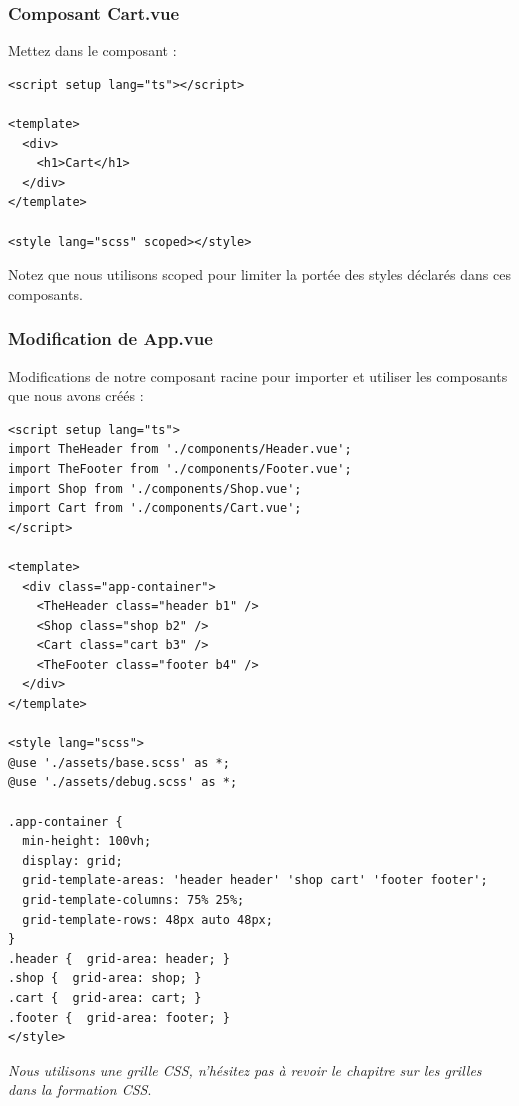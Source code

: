 \documentclass{article}
\begin{document}
\subsubsection{Composant {\color{monOrange}Cart.vue}}
Mettez dans le composant :
\begin{verbatim}
<script setup lang="ts"></script>

<template>
  <div>
    <h1>Cart</h1>
  </div>
</template>

<style lang="scss" scoped></style>
\end{verbatim}

Notez que nous utilisons {\color{monOrange}scoped} pour limiter la portée des styles déclarés dans ces composants.

\subsubsection{Modification de {\color{monOrange}App.vue}}
Modifications de notre composant racine pour importer et utiliser les composants que nous avons créés :
\begin{verbatim}
<script setup lang="ts">
import TheHeader from './components/Header.vue';
import TheFooter from './components/Footer.vue';
import Shop from './components/Shop.vue';
import Cart from './components/Cart.vue';
</script>

<template>
  <div class="app-container">
    <TheHeader class="header b1" />
    <Shop class="shop b2" />
    <Cart class="cart b3" />
    <TheFooter class="footer b4" />
  </div>
</template>

<style lang="scss">
@use './assets/base.scss' as *;
@use './assets/debug.scss' as *;

.app-container {
  min-height: 100vh;
  display: grid;
  grid-template-areas: 'header header' 'shop cart' 'footer footer';
  grid-template-columns: 75% 25%;
  grid-template-rows: 48px auto 48px;
}
.header {  grid-area: header; }
.shop {  grid-area: shop; }
.cart {  grid-area: cart; }
.footer {  grid-area: footer; }
</style>
\end{verbatim}

{\em Nous utilisons une grille {\color{monOrange}CSS}, n'hésitez pas à revoir le chapitre sur les grilles dans la formation {\color{monOrange}CSS}}.

\end{document}
